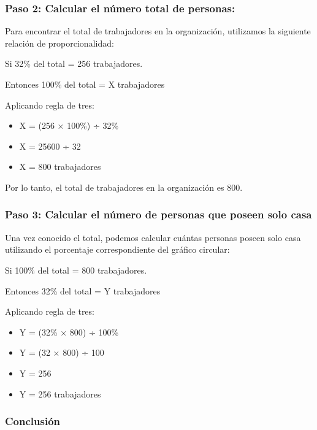 \documentclass[
]{article}
\providecommand{\tightlist}{%
  \setlength{\itemsep}{0pt}\setlength{\parskip}{0pt}}
\begin{document}
\subsubsection{Paso 2: Calcular el número total de
personas:}\label{paso-2-calcular-el-nuxfamero-total-de-personas}

Para encontrar el total de trabajadores en la organización, utilizamos
la siguiente relación de proporcionalidad:

Si 32\% del total = 256 trabajadores.

Entonces 100\% del total = X trabajadores

Aplicando regla de tres:

\begin{itemize}
\tightlist
\item
  X = (256 × 100\%) ÷ 32\%
\item
  X = 25600 ÷ 32
\item
  X = 800 trabajadores
\end{itemize}

Por lo tanto, el total de trabajadores en la organización es 800.

\subsubsection{Paso 3: Calcular el número de personas que poseen solo
casa}\label{paso-3-calcular-el-nuxfamero-de-personas-que-poseen-solo-casa}

Una vez conocido el total, podemos calcular cuántas personas poseen solo
casa utilizando el porcentaje correspondiente del gráfico circular:

Si 100\% del total = 800 trabajadores.

Entonces 32\% del total = Y trabajadores

Aplicando regla de tres:

\begin{itemize}
\tightlist
\item
  Y = (32\% × 800) ÷ 100\%
\item
  Y = (32 × 800) ÷ 100
\item
  Y = 256
\item
  Y = 256 trabajadores
\end{itemize}

\subsubsection{Conclusión}\label{conclusiuxf3n}
\end{document}
